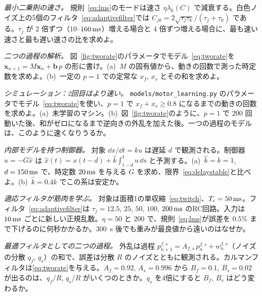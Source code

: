 \begin{exercise}[\lvlB]
\label{ex:15:2}
\emph{最小二乗則の速さ。} 規則~\eqref{eq:lms}のモードは速さ $\eta\lambda_k(C)$ で減衰する。白色ノイズ上の5個のフィルタ~\eqref{eq:adaptivefilter}では $C_{jk}=2\sqrt{\tau_j\tau_k}/(\tau_j+\tau_k)$ である。$\tau_j$ が $2$ 倍ずつ（$10$--$160\,\text{ms}$）増える場合と $4$ 倍ずつ増える場合に、最も速い速さと最も遅い速さの比を求めよ。
\end{exercise}

\begin{exercise}[\lvlB]
\label{ex:15:3}
\emph{二つの過程の解析。} 図~\ref{fig:tworate}のパラメータでモデル~\eqref{eq:tworate}を $\mathbf x_{n+1}=M\mathbf x_n+\mathbf b\,p$ の形に書け。(a)~$M$ の固有値から、動きの回数で測った時定数を求めよ。(b)~一定の $p=1$ での定常な $x_f$, $x_s$ とその和を求めよ。
\end{exercise}

\begin{exercise}[\lvlB]
\label{ex:15:4}
\emph{シミュレーション：2回目はより速い。} \texttt{models/\allowbreak motor\_learning.py} のパラメータでモデル~\eqref{eq:tworate}を使い、$p=1$ で $x_f+x_s\ge0.8$ になるまでの動きの回数を求めよ。(a)~未学習のマシン。(b)~図~\ref{fig:tworate}のように、$p=1$ で $200$ 回動いた後、和がゼロになるまで逆向きの外乱を加えた後。一つの過程のモデルは、このように速くなりうるか。
\end{exercise}

\begin{exercise}[\lvlB]
\label{ex:15:5}
\emph{内部モデルを持つ制御器。} 対象 $\dd x/\dd t=ku$ は遅延 $d$ で観測される。制御器 $u=-G\hat x$ は $\hat x(t)=x(t-d)+\hat k\int_{t-d}^{t}u\,\dd s$ と予測する。(a)~$\hat k=k=1$, $d=150\,\text{ms}$ で、時定数 $20\,\text{ms}$ を与える $G$ を求め、限界~\eqref{eq:delaystable}と比べよ。(b)~$\hat k=0.4k$ でこの系は安定か。
\end{exercise}

\begin{exercise}[\lvlB]
\label{ex:15:6}
\emph{適応フィルタが筋肉を学ぶ。} 対象は面積1の単収縮~\eqref{eq:twitch}、$T_c=50\,\text{ms}$。フィルタ~\eqref{eq:adaptivefilter}は $\tau_j=12.5$, $25$, $50$, $100$, $200\,\text{ms}$ のRC回路。入力は $10\,\text{ms}$ ごとに新しい正規乱数。$\eta=50$ と $200$ で、規則~\eqref{eq:lms}が誤差を $0.5\%$ まで下げるのに何秒かかるか。$300$~s 後でも重みが最良値から遠いのはなぜか。
\end{exercise}

\begin{exercise}[\lvlC]
\label{ex:15:7}
\emph{最適フィルタとしての二つの過程。} 外乱は過程 $p^{f,s}_{n+1}=A_{f,s}\,p^{f,s}_n+w^{f,s}_n$（ノイズの分散 $q_f$, $q_s$）の和で、誤差は分散 $R$ のノイズとともに観測される。カルマンフィルタは\eqref{eq:tworate}を与える。$A_f=0.92$, $A_s=0.996$ から $B_f=0.1$, $B_s=0.02$ が出るのは、$q_f/R$, $q_s/R$ がいくつのときか。$q_s$ を4倍にすると $B_f$, $B_s$ はどう変わるか。
\end{exercise}
